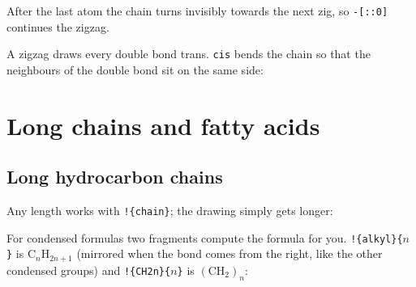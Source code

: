 \documentclass[11pt]{article}
\newcommand\key[1]{\texttt{\color{cfcode}#1}}
\newcommand\frag[1]{\texttt{!\{#1\}}}
\begin{document}
After the last atom the chain turns invisibly towards the next zig, so
\verb|-[::0]| continues the zigzag.
\begin{example}
\end{example}
\begin{example}
\quad
{}
\end{example}
\begin{example}
\end{example}
\begin{example}
\end{example}
A zigzag draws every double bond trans. \key{cis} bends the chain so that
the neighbours of the double bond sit on the same side:
\begin{example}
\quad
{}
\end{example}

\section{Long chains and fatty acids}

\subsection{Long hydrocarbon chains}
Any length works with \frag{chain}; the drawing simply gets longer:
\begin{examplewide}
\par\medskip
{}
\end{examplewide}

For condensed formulas two fragments compute the formula for you.
\frag{alkyl}\verb|{|$n$\verb|}| is $\mathrm{C}_n\mathrm{H}_{2n+1}$ (mirrored when the
bond comes from the right, like the other condensed groups) and
\frag{CH2n}\verb|{|$n$\verb|}| is $(\mathrm{CH}_2)_n$:
\begin{example}
\par\medskip
{}\quad
{}
\end{example}
\end{document}
